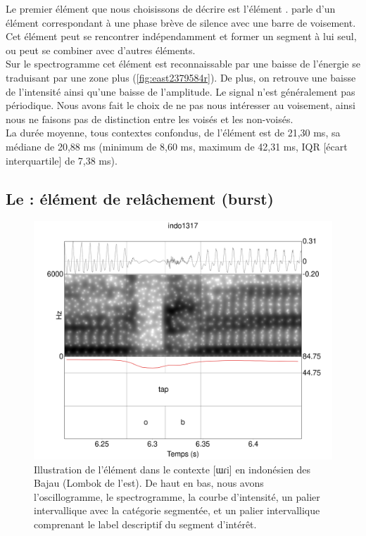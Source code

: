 Le premier élément que nous choisissons de décrire est l'élément . \textcite[65]{blecuaVibrantesEspanolManifestaciones2002} parle d'un élément correspondant à une phase brève de silence avec une barre de voisement. Cet élément peut se rencontrer indépendamment et former un segment à lui seul, ou peut se combiner avec d'autres éléments. \\

Sur le spectrogramme cet élément est reconnaissable par une baisse de l'énergie se traduisant par une zone plus  (\autoref{fig:east2379584r}). De plus, on retrouve une baisse de l'intensité ainsi qu'une baisse de l'amplitude. Le signal n'est généralement pas périodique. Nous avons fait le choix de ne pas nous intéresser au voisement, ainsi nous ne faisons pas de distinction entre les  voisés et les  non-voisés.\\

La durée moyenne, tous contextes confondus, de l'élément  est de 21,30 ms, sa médiane de 20,88 ms (minimum de 8,60 ms, maximum de 42,31 ms, IQR [écart interquartile] de 7,38 ms).


\subsection{Le  : élément de relâchement (burst)}

\begin{figure}
	\centering
	\includegraphics[width=0.8\linewidth]{substance/spectro_images/indo1317_477_}
	\caption[Illustration de l'élément ]{Illustration de l'élément  dans le contexte [ɯɾi] en indonésien des Bajau (Lombok de l'est). De haut en bas, nous avons l'oscillogramme, le spectrogramme, la courbe d'intensité, un palier intervallique avec la catégorie segmentée, et un palier intervallique comprenant le label descriptif du segment d'intérêt.}
	\label{fig:indo1317477}
\end{figure}

